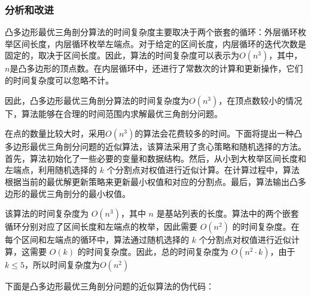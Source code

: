 \documentclass[lang=cn,11pt,a4paper]{elegantpaper}
\begin{document}
\subsubsection{分析和改进}
凸多边形最优三角剖分算法的时间复杂度主要取决于两个嵌套的循环：外层循环枚举区间长度，内层循环枚举左端点。对于给定的区间长度，内层循环的迭代次数是固定的，取决于区间长度。因此，算法的时间复杂度可以表示为$O(n^3)$，其中，$n$是凸多边形的顶点数。在内层循环中，还进行了常数次的计算和更新操作，它们的时间复杂度可以忽略不计。

因此，凸多边形最优三角剖分算法的时间复杂度为$O(n^3)$，在顶点数较小的情况下，算法能够在合理的时间范围内求解最优三角剖分问题。

在点的数量比较大时，采用$O(n^3)$的算法会花费较多的时间。下面将提出一种凸多边形最优三角剖分问题的近似算法，该算法采用了贪心策略和随机选择的方法。首先，算法初始化了一些必要的变量和数据结构。然后，从小到大枚举区间长度和左端点，利用随机选择的 $k$ 个分割点对权值进行近似计算。在计算过程中，算法根据当前的最优解更新策略来更新最小权值和对应的分割点。最后，算法输出凸多边形的最优三角剖分的最小权值。

该算法的时间复杂度为 $O(n^3)$，其中 $n$ 是基站列表的长度。算法中的两个嵌套循环分别对应了区间长度和左端点的枚举，因此需要 $O(n^2)$ 的时间复杂度。在每个区间和左端点的循环中，算法通过随机选择的 $k$ 个分割点对权值进行近似计算，这需要 $O(k)$ 的时间复杂度。因此，总的时间复杂度为 $O(n^2 \cdot k)$，由于$k \leq 5$，所以时间复杂度为$O(n^2)$

下面是凸多边形最优三角剖分问题的近似算法的伪代码：
\end{document}
